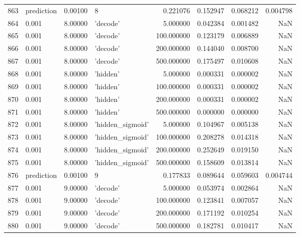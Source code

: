 \documentclass[10pt,a4paper]{article}
\begin{document}
\begin{tabular}{llrlrrrr}
863  &  prediction &   0.00100 &                  8 &    0.221076 &  0.152947 &  0.068212 &  0.004798 \\
864  &       0.001 &   8.00000 &           'decode' &    5.000000 &  0.042384 &  0.001482 &       NaN \\
865  &       0.001 &   8.00000 &           'decode' &  100.000000 &  0.123179 &  0.006889 &       NaN \\
866  &       0.001 &   8.00000 &           'decode' &  200.000000 &  0.144040 &  0.008700 &       NaN \\
867  &       0.001 &   8.00000 &           'decode' &  500.000000 &  0.175497 &  0.010608 &       NaN \\
868  &       0.001 &   8.00000 &           'hidden' &    5.000000 &  0.000331 &  0.000002 &       NaN \\
869  &       0.001 &   8.00000 &           'hidden' &  100.000000 &  0.000331 &  0.000002 &       NaN \\
870  &       0.001 &   8.00000 &           'hidden' &  200.000000 &  0.000331 &  0.000002 &       NaN \\
871  &       0.001 &   8.00000 &           'hidden' &  500.000000 &  0.000000 &  0.000000 &       NaN \\
872  &       0.001 &   8.00000 &   'hidden\_sigmoid' &    5.000000 &  0.104967 &  0.005138 &       NaN \\
873  &       0.001 &   8.00000 &   'hidden\_sigmoid' &  100.000000 &  0.208278 &  0.014318 &       NaN \\
874  &       0.001 &   8.00000 &   'hidden\_sigmoid' &  200.000000 &  0.252649 &  0.019150 &       NaN \\
875  &       0.001 &   8.00000 &   'hidden\_sigmoid' &  500.000000 &  0.158609 &  0.013814 &       NaN \\
876  &  prediction &   0.00100 &                  9 &    0.177833 &  0.089644 &  0.059603 &  0.004744 \\
877  &       0.001 &   9.00000 &           'decode' &    5.000000 &  0.053974 &  0.002864 &       NaN \\
878  &       0.001 &   9.00000 &           'decode' &  100.000000 &  0.123841 &  0.007057 &       NaN \\
879  &       0.001 &   9.00000 &           'decode' &  200.000000 &  0.171192 &  0.010254 &       NaN \\
880  &       0.001 &   9.00000 &           'decode' &  500.000000 &  0.182781 &  0.010417 &       NaN \\

\end{tabular}
\end{document}
